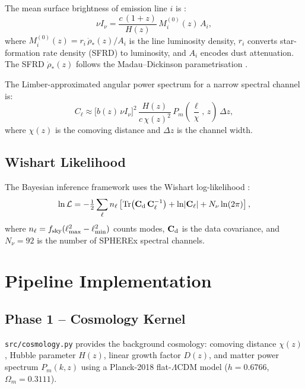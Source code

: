 \documentclass[12pt]{article}
\begin{document}
The mean surface brightness of emission line $i$ is \citep{Cheng2024}:
\begin{equation}
    \nu I_\nu = \frac{c\,(1+z)}{H(z)}\, M_i^{(0)}(z)\, A_i,
\label{eq:limintensity}
\end{equation}
where $M_i^{(0)}(z) = r_i\,\dot{\rho}_*(z)/A_i$ is the line luminosity
density, $r_i$ converts star-formation rate density (SFRD) to luminosity, and
$A_i$ encodes dust attenuation.  The SFRD $\dot{\rho}_*(z)$ follows the
Madau--Dickinson parametrisation \citep{MadauDickinson2014}.

The Limber-approximated angular power spectrum for a narrow spectral channel
is:
\begin{equation}
    C_\ell \approx \bigl[b(z)\,\nu I_\nu\bigr]^2\,
    \frac{H(z)}{c\,\chi(z)^2}\,P_m\!\left(\frac{\ell}{\chi},\,z\right)\,\Delta z,
\label{eq:cell}
\end{equation}
where $\chi(z)$ is the comoving distance and $\Delta z$ is the channel width.

\subsection{Wishart Likelihood}

The Bayesian inference framework uses the Wishart log-likelihood
\citep{Cheng2024}:
\begin{equation}
    \ln\mathcal{L} = -\tfrac{1}{2}\sum_\ell n_\ell
    \left[\mathrm{Tr}\!\left(\mathbf{C}_{\rm d}\,\mathbf{C}_\ell^{-1}\right)
          + \ln\!\left|\mathbf{C}_\ell\right|
          + N_\nu\ln(2\pi)\right],
\label{eq:wishart}
\end{equation}
where $n_\ell = f_{\rm sky}(\ell_{\rm max}^2 - \ell_{\rm min}^2)$ counts
modes, $\mathbf{C}_{\rm d}$ is the data covariance, and $N_\nu = 92$ is the
number of SPHEREx spectral channels.

\section{Pipeline Implementation}
\label{sec:pipeline}

\subsection{Phase 1 -- Cosmology Kernel}

\texttt{src/cosmology.py} provides the background cosmology: comoving
distance $\chi(z)$, Hubble parameter $H(z)$, linear growth factor $D(z)$,
and matter power spectrum $P_m(k,z)$ using a Planck-2018 flat-$\Lambda$CDM
model ($h = 0.6766$, $\Omega_m = 0.3111$).
\end{document}
